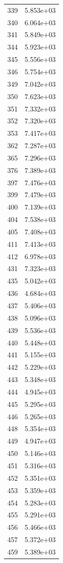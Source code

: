 \documentclass[12pt]{article}
\begin{document}
\begin{longtable}{@{}cc@{}}
339 & 5.853e+03 \\
340 & 6.064e+03 \\
341 & 5.849e+03 \\
344 & 5.923e+03 \\
345 & 5.556e+03 \\
346 & 5.754e+03 \\
349 & 7.042e+03 \\
350 & 7.623e+03 \\
351 & 7.332e+03 \\
352 & 7.320e+03 \\
353 & 7.417e+03 \\
362 & 7.287e+03 \\
365 & 7.296e+03 \\
376 & 7.389e+03 \\
397 & 7.476e+03 \\
399 & 7.479e+03 \\
400 & 7.139e+03 \\
404 & 7.538e+03 \\
405 & 7.408e+03 \\
411 & 7.413e+03 \\
412 & 6.978e+03 \\
431 & 7.323e+03 \\
435 & 5.042e+03 \\
436 & 4.684e+03 \\
437 & 5.406e+03 \\
438 & 5.096e+03 \\
439 & 5.536e+03 \\
440 & 5.448e+03 \\
441 & 5.155e+03 \\
442 & 5.229e+03 \\
443 & 5.348e+03 \\
444 & 4.945e+03 \\
445 & 5.295e+03 \\
446 & 5.265e+03 \\
448 & 5.354e+03 \\
449 & 4.947e+03 \\
450 & 5.146e+03 \\
451 & 5.316e+03 \\
452 & 5.351e+03 \\
453 & 5.359e+03 \\
454 & 5.283e+03 \\
455 & 5.291e+03 \\
456 & 5.466e+03 \\
457 & 5.372e+03 \\
459 & 5.389e+03 \\

\end{longtable}
\end{document}
